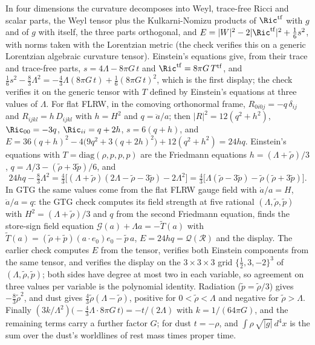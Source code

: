 In four dimensions the curvature decomposes into Weyl, trace-free Ricci and scalar parts, the Weyl tensor plus the Kulkarni-Nomizu products of $\Ric^{\mathrm{tf}}$ with $g$ and of $g$ with itself, the three parts orthogonal, and $E = |W|^{2} - 2|\Ric^{\mathrm{tf}}|^{2} + \tfrac16 s^{2}$, with norms taken with the Lorentzian metric (the check verifies this on a generic Lorentzian algebraic curvature tensor). Einstein's equations give, from their trace and trace-free parts, $s = 4\Lambda - 8\pi G\,t$ and $\Ric^{\mathrm{tf}} = 8\pi G\,T^{\mathrm{tf}}$, and $\tfrac16 s^{2} - \tfrac83\Lambda^{2} = -\tfrac43\Lambda(8\pi G\,t) + \tfrac16(8\pi G\,t)^{2}$, which is the first display; the check verifies it on the generic tensor with $T$ defined by Einstein's equations at three values of $\Lambda$. For flat FLRW, in the comoving orthonormal frame, $R_{0i0j} = -q\,\delta_{ij}$ and $R_{ijkl} = h\,D_{ijkl}$ with $h = H^{2}$ and $q = \ddot a/a$; then $|R|^{2} = 12(q^{2} + h^{2})$, $\Ric_{00} = -3q$, $\Ric_{ii} = q + 2h$, $s = 6(q + h)$, and $E = 36(q + h)^{2} - 4\bigl(9q^{2} + 3(q + 2h)^{2}\bigr) + 12(q^{2} + h^{2}) = 24hq$. Einstein's equations with $T = \mathrm{diag}(\rho, p, p, p)$ are the Friedmann equations $h = (\Lambda + \tilde\rho)/3$, $q = \Lambda/3 - (\tilde\rho + 3\tilde p)/6$, and
\[
24hq - \tfrac83\Lambda^{2} = \tfrac{4}{3}\bigl[(\Lambda + \tilde\rho)(2\Lambda - \tilde\rho - 3\tilde p) - 2\Lambda^{2}\bigr] = \tfrac43\bigl[\Lambda(\tilde\rho - 3\tilde p) - \tilde\rho(\tilde\rho + 3\tilde p)\bigr].
\]
In GTG the same values come from the flat FLRW gauge field with $\dot a/a = H$, $\ddot a/a = q$: the GTG check computes its field strength at five rational $(\Lambda, \tilde\rho, \tilde p)$ with $H^{2} = (\Lambda + \tilde\rho)/3$ and $q$ from the second Friedmann equation, finds the store-sign field equation $\mathcal{G}(a) + \Lambda a = -\tilde T(a)$ with $\tilde T(a) = (\tilde\rho + \tilde p)(a\cdot e_{0})e_{0} - \tilde p\,a$, $E = 24hq = \mathcal{Q}(\mathcal{R})$ and the display. The earlier check computes $E$ from the tensor, verifies both Einstein components from the same tensor, and verifies the display on the $3 \times 3 \times 3$ grid $\{\tfrac12, 3, -2\}^{3}$ of $(\Lambda, \tilde\rho, \tilde p)$; both sides have degree at most two in each variable, so agreement on three values per variable is the polynomial identity. Radiation ($\tilde p = \tilde\rho/3$) gives $-\tfrac83\tilde\rho^{2}$, and dust gives $\tfrac43\tilde\rho(\Lambda - \tilde\rho)$, positive for $0 < \tilde\rho < \Lambda$ and negative for $\tilde\rho > \Lambda$. Finally $(3k/\Lambda^{2})\bigl(-\tfrac43\Lambda\cdot 8\pi G\,t\bigr) = -t/(2\Lambda)$ with $k = 1/(64\pi G)$, and the remaining terms carry a further factor $G$; for dust $t = -\rho$, and $\int\rho\,\sqrt{|g|}\,d^{4}x$ is the sum over the dust's worldlines of rest mass times proper time.

